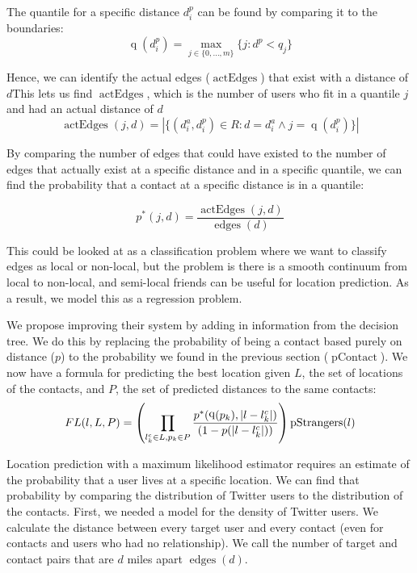 \documentclass[letterpaper]{article}
\DeclareMathOperator{\pContact}{pContact}
\DeclareMathOperator{\pStrangers}{pStrangers}
\DeclareMathOperator{\edges}{edges}
\DeclareMathOperator{\actEdges}{actEdges}
\DeclareMathOperator{\quantile}{q}
\begin{document}
\noindent The quantile for a specific distance $d^p_i$ can be found by comparing it to the boundaries:
\[
    \quantile(d^p_i) = \max_{j \in \{0,\dots,m\}} \{j: d^p<q_j\}
\]

Hence, we can identify the actual edges ($\actEdges$) that exist with a distance of $d$This lets us find $\actEdges$, which is the number of users who fit in a quantile $j$ and had an actual distance of $d$
\[
    \actEdges(j,d) = |\{
            (d^a_i,d^p_i) \in R :
            d=d^a_i \wedge j=\quantile(d^p_i)
        \}|
\]

By comparing the number of edges that could have existed to the number of edges that actually exist at a specific distance and in a specific quantile, we can find the probability that a contact at a specific distance is in a quantile:

\[
p^*(j,d) = \frac{\actEdges(j,d)}{\edges(d)}
\]

This could be looked at as a classification problem where we want to classify edges as local or non-local, but the problem is there is a smooth continuum from local to non-local, and semi-local friends can be useful for location prediction. As a result, we model this as a regression problem.





We propose improving their system by adding in information from the decision tree. We do this by replacing the probability of being a contact based purely on distance ($p$) to the probability we found in the previous section ($\pContact$). We now have a formula for predicting the best location given $L$, the set of locations of the contacts, and $P$, the set of predicted distances to the same
contacts:
\[
    FL(l,L,P) =
        \left(
            \prod_{l^c_k \in L,p_k \in P}
            {p^*(\quantile(p_k),|l-l^c_k|) \over (1-p(|l-l^c_k|))}
        \right)
        \pStrangers(l)
\]

Location prediction with a maximum likelihood estimator requires an estimate of the probability that a user lives at a specific location. We can find that probability by comparing the distribution of Twitter users to the distribution of the contacts. First, we needed a model for the density of Twitter users. We calculate the distance between every target user and every contact (even for contacts and users who had no relationship). We call the number of target and contact pairs that are $d$ miles apart $\edges(d)$.

\end{document}
